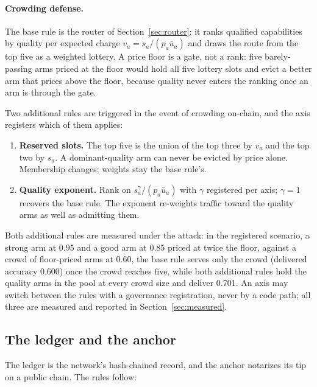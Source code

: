 \documentclass[11pt]{article}
\begin{document}
\paragraph{Crowding defense.} The base rule is the router of
Section~\ref{sec:router}: it ranks qualified capabilities by
quality per expected charge $v_a = s_a/(p_a \bar u_a)$ and draws
the route from the top five as a weighted lottery. A price floor
is a gate, not a rank: five barely-passing arms priced at the
floor would hold all five lottery slots and evict a better arm
that prices above the floor, because quality never enters the
ranking once an arm is through the gate.

Two additional rules are triggered in the event of crowding
on-chain, and the axis registers which of them applies:

\begin{enumerate}
    \item \textbf{Reserved slots.} The top five is the union of the
          top three by $v_a$ and the top two by $s_a$. A dominant-quality
          arm can never be evicted by price alone. Membership changes;
          weights stay the base rule's.
    \item \textbf{Quality exponent.} Rank on $s_a^{\gamma}/(p_a\bar
              u_a)$ with $\gamma$ registered per axis; $\gamma = 1$ recovers
          the base rule. The exponent re-weights traffic toward the
          quality arms as well as admitting them.
\end{enumerate}

Both additional rules are measured under the attack: in the
registered scenario, a strong arm at 0.95 and a good arm at
0.85 priced at twice the floor, against a crowd of floor-priced
arms at 0.60, the base rule serves only the crowd (delivered
accuracy 0.600) once the crowd reaches five, while both
additional rules hold the quality arms in the pool at every
crowd size and deliver 0.701. An axis may switch between the
rules with a governance registration, never by a code path; all
three are measured and reported in Section~\ref{sec:measured}.

\subsection{The ledger and the anchor}

The ledger is the network's hash-chained record, and the anchor
notarizes its tip on a public chain. The rules follow:
\end{document}
